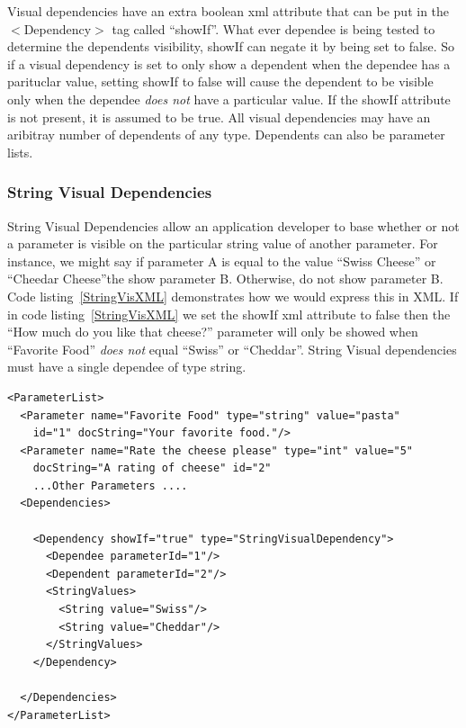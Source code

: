 Visual dependencies have an extra boolean xml attribute that can be put in the $<$Dependency$>$ tag called ``showIf''. What ever dependee is being tested to 
determine the dependents visibility, showIf can negate it by being set to false. So if a visual dependency is set to only show a dependent when the
dependee has a parituclar value, setting showIf to false will cause the dependent to be visible only when the dependee \emph{does not} have a particular
value. If the showIf attribute is not present, it is assumed to be true. All visual dependencies may have an aribitray number of dependents of any type.
Dependents can also be parameter lists.

\subsubsection{String Visual Dependencies}
String Visual Dependencies allow an application developer to base whether or not a parameter is visible on the particular string value of another
parameter. For instance, we might say if parameter A is equal to the value ``Swiss Cheese'' or ``Cheedar Cheese''the show parameter B. Otherwise, do not 
show parameter B. Code listing~\ref{StringVisXML} demonstrates how we would express this in XML.  If in code listing~\ref{StringVisXML} we set the showIf xml attribute to false then the ``How much do you like that cheese?'' parameter will only be showed when ``Favorite Food'' \emph{does not} equal ``Swiss'' or ``Cheddar''.
String Visual dependencies must have a single dependee of type string. 
\begin{lstlisting}[caption={Example usage of a String Visual Dependency}, label=StringVisXML]
<ParameterList>
  <Parameter name="Favorite Food" type="string" value="pasta"
    id="1" docString="Your favorite food."/>
  <Parameter name="Rate the cheese please" type="int" value="5"
    docString="A rating of cheese" id="2"
    ...Other Parameters ....
  <Dependencies>

    <Dependency showIf="true" type="StringVisualDependency">
      <Dependee parameterId="1"/>
      <Dependent parameterId="2"/>
      <StringValues>
        <String value="Swiss"/>
        <String value="Cheddar"/>
      </StringValues>
    </Dependency>

  </Dependencies>
</ParameterList>
\end{lstlisting}

